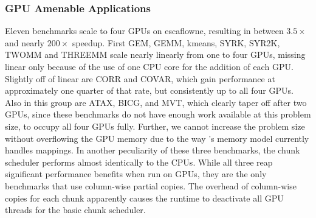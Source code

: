 
\subsubsection{GPU Amenable Applications}

Eleven benchmarks scale to four GPUs on escaflowne, resulting in between
$3.5\times$ and nearly $200\times$ speedup. First  GEM, GEMM, kmeans, SYRK,
SYR2K, TWOMM and THREEMM scale nearly linearly from one to four GPUs, missing
linear only because of the use of one CPU core for the addition of each GPU.
Slightly off of linear are CORR and COVAR, which gain performance at
approximately one quarter of that rate, but consistently up to all four GPUs.
Also in this group are ATAX, BICG, and MVT, which clearly taper off after two
GPUs, since these benchmarks do not have enough work available at this problem
size, to occupy all four GPUs fully. Further, we cannot  increase the problem
size without overflowing the GPU memory due to the way \tsar's memory model
currently handles mappings. In another peculiarity of these three benchmarks,
the chunk scheduler performs almost identically to the CPUs. While all three
reap significant performance benefits when run on GPUs, they are the only
benchmarks that use column-wise partial copies. The overhead of column-wise
copies for each chunk apparently causes the runtime to deactivate all GPU
threads for the basic chunk scheduler.

